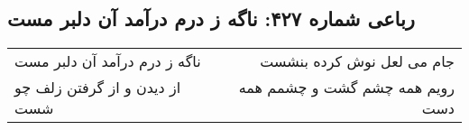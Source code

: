 \begin{center}
\section*{رباعی شماره ۴۲۷: ناگه ز درم درآمد آن دلبر مست}
\label{sec:0427}
\begin{longtable}{l p{0.5cm} r}
ناگه ز درم درآمد آن دلبر مست
&&
جام می لعل نوش کرده بنشست
\\
از دیدن و از گرفتن زلف چو شست
&&
رویم همه چشم گشت و چشمم همه دست
\\
\end{longtable}
\end{center}
